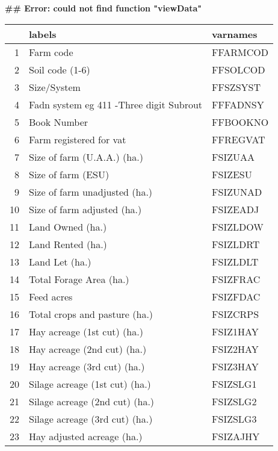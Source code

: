 \documentclass{article}\usepackage{graphicx, color}
\makeatletter
\newenvironment{kframe}{%
 \def\at@end@of@kframe{}%
 \ifinner\ifhmode%
  \def\at@end@of@kframe{\end{minipage}}%
  \begin{minipage}{\columnwidth}%
 \fi\fi%
 \def\FrameCommand##1{\hskip\@totalleftmargin \hskip-\fboxsep
 \colorbox{shadecolor}{##1}\hskip-\fboxsep
     \hskip-\linewidth \hskip-\@totalleftmargin \hskip\columnwidth}%
 \MakeFramed {\advance\hsize-\width
   \@totalleftmargin\z@ \linewidth\hsize
   \@setminipage}}%
 {\par\unskip\endMakeFramed%
 \at@end@of@kframe}
\newenvironment{knitrout}{}{} %
\makeatother
\begin{document}
\begin{flushleft}
\begin{knitrout}
\begin{kframe}
{\ttfamily\noindent\bfseries\textcolor{errorcolor}{\#\# Error: could not find function "viewData"}}\end{kframe}
\end{knitrout}



\begin{table}[ht]
\begin{center}
\begin{tabular}{rll}
  \hline
 & labels & varnames \\ 
  \hline
1 & Farm code & FFARMCOD \\ 
  2 & Soil code     (1-6) & FFSOLCOD \\ 
  3 & Size/System & FFSZSYST \\ 
  4 & Fadn system eg 411 -Three digit Subrout & FFFADNSY \\ 
  5 & Book Number & FFBOOKNO \\ 
  6 & Farm registered for vat & FFREGVAT \\ 
  7 & Size of farm (U.A.A.)    (ha.) & FSIZUAA \\ 
  8 & Size of farm (ESU) & FSIZESU \\ 
  9 & Size of farm unadjusted  (ha.) & FSIZUNAD \\ 
  10 & Size of farm adjusted    (ha.) & FSIZEADJ \\ 
  11 & Land Owned               (ha.) & FSIZLDOW \\ 
  12 & Land  Rented             (ha.) & FSIZLDRT \\ 
  13 & Land  Let                (ha.) & FSIZLDLT \\ 
  14 & Total Forage Area        (ha.) & FSIZFRAC \\ 
  15 & Feed acres & FSIZFDAC \\ 
  16 & Total crops and pasture  (ha.) & FSIZCRPS \\ 
  17 & Hay acreage (1st cut)    (ha.) & FSIZ1HAY \\ 
  18 & Hay acreage (2nd cut)    (ha.) & FSIZ2HAY \\ 
  19 & Hay acreage (3rd cut)    (ha.) & FSIZ3HAY \\ 
  20 & Silage acreage (1st cut) (ha.) & FSIZSLG1 \\ 
  21 & Silage acreage (2nd cut) (ha.) & FSIZSLG2 \\ 
  22 & Silage acreage (3rd cut) (ha.) & FSIZSLG3 \\ 
  23 & Hay adjusted acreage     (ha.) & FSIZAJHY \\ 

\end{tabular}
\end{center}
\end{table}
\end{flushleft}
\end{document}
